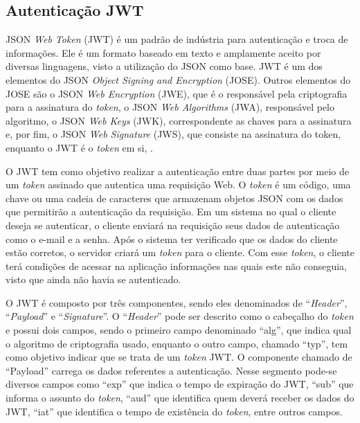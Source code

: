 \documentclass[
    12pt,               %
    openright,          %
    oneside,
    a4paper,            %
    BIBLATEX,           %
    TODO,               %
    english,            %
    brazil              %
    ]{ifsp-spo-inf-ctds}
\begin{document}
        \subsection{Autenticação JWT}
    
            JSON \emph{Web Token} (JWT) é um padrão de indústria para autenticação e troca de informações. Ele é um formato baseado em texto e amplamente aceito por diversas linguagens, visto a utilização do JSON como base. JWT é um dos elementos do JSON \emph{Object Signing and Encryption} (JOSE). Outros elementos do JOSE são o JSON \emph{Web Encryption} (JWE), que é o responsável pela criptografia para a assinatura do \emph{token}, o JSON \emph{Web Algorithms} (JWA), responsável pelo algoritmo, o JSON \emph{Web Keys} (JWK), correspondente as chaves para a assinatura e, por fim, o JSON \emph{Web Signature} (JWS), que consiste na assinatura do token, enquanto o JWT é o \emph{token} em si, .
            
            O JWT tem como objetivo realizar a autenticação entre duas partes por meio de um \emph{token} assinado que autentica uma requisição Web. O \emph{token} é um código, uma chave ou uma cadeia de caracteres que armazenam objetos JSON com os dados que permitirão a autenticação da requisição.
            Em um sistema no qual o cliente deseja se autenticar, o cliente enviará na requisição seus dados de autenticação como o e-mail e a senha. Após o sistema ter verificado que os dados do cliente estão corretos, o servidor criará um \emph{token} para o cliente. Com esse \emph{token}, o cliente terá condições de acessar na aplicação informações nas quais este não conseguia, visto que ainda não havia se autenticado. 
            
            O JWT é composto por três componentes, sendo eles denominados de “\emph{Header}”, “\emph{Payload}” e “\emph{Signature}”. O “\emph{Header}” pode ser descrito como o cabeçalho do \emph{token} e possui dois campos, sendo o primeiro campo denominado “alg”, que indica qual o algoritmo de criptografia usado, enquanto o outro campo, chamado “typ”, tem como objetivo indicar que se trata de um \emph{token} JWT. 
            O componente chamado de “Payload” carrega os dados referentes a autenticação. Nesse segmento pode-se diversos campos como “exp” que indica o tempo de expiração do JWT, “sub” que informa o assunto do \emph{token}, “aud” que identifica quem deverá receber os dados do JWT, “iat” que identifica o tempo de existência do \emph{token}, entre outros campos.
            
\end{document}
